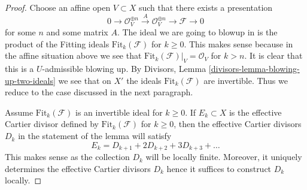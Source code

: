 \documentclass[10pt,a4paper]{amsart}
\theoremstyle{plain}
\theoremstyle{definition}
\theoremstyle{remark}
\numberwithin{equation}{subsection}
\begin{document}
\begin{proof}
Choose an affine open $V \subset X$ such that there exists a presentation
$$
0 \to \mathcal{O}_V^{\oplus n} \xrightarrow{A} \mathcal{O}_V^{\oplus n} \to
\mathcal{F} \to 0
$$
for some $n$ and some matrix $A$. The ideal we are going to blowup in
is the product of the Fitting ideals $\text{Fit}_k(\mathcal{F})$
for $k \geq 0$. This makes sense because in the affine
situation above we see that $\text{Fit}_k(\mathcal{F})|_V = \mathcal{O}_V$
for $k > n$. It is clear that this is a $U$-admissible blowing up. By
Divisors, Lemma \ref{divisors-lemma-blowing-up-two-ideals}
we see that on $X'$ the ideals $\text{Fit}_k(\mathcal{F})$
are invertible. Thus we reduce to the case discussed in the
next paragraph.

\medskip\noindent
Assume $\text{Fit}_k(\mathcal{F})$ is an invertible ideal for
$k \geq 0$. If $E_k \subset X$ is the effective
Cartier divisor defined by $\text{Fit}_k(\mathcal{F})$
for $k \geq 0$, then the effective Cartier divisors
$D_k$ in the statement of the lemma will satisfy
$$
E_k = D_{k + 1} + 2 D_{k + 2} + 3 D_{k + 3} + \ldots
$$
This makes sense as the collection $D_k$ will be locally finite.
Moreover, it uniquely determines the effective Cartier divisors $D_k$
hence it suffices to construct $D_k$ locally.


\end{proof}
\end{document}
